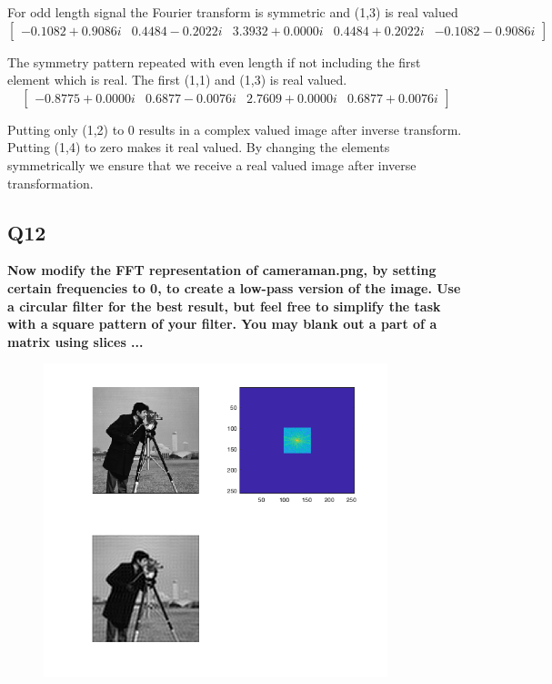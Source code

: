 \documentclass[oneside,a4paper]{article}
\begin{document}
For odd length signal the Fourier transform is symmetric and (1,3) is real valued
\begin{equation}
\begin{bmatrix} -0.1082 + 0.9086i&   0.4484 - 0.2022i&   3.3932 + 0.0000i&   0.4484 + 0.2022i&  -0.1082 - 0.9086i \end{bmatrix}
\nonumber
\end{equation}

The symmetry pattern repeated with even length if not including the first element which is real. The first (1,1) and (1,3) is real valued.
\begin{equation}
\begin{bmatrix} -0.8775 + 0.0000i&   0.6877 - 0.0076i&   2.7609 + 0.0000i&   0.6877 + 0.0076i \end{bmatrix}
\nonumber
\end{equation}

Putting only (1,2) to 0 results in a complex valued image after inverse transform. Putting (1,4) to zero makes it real valued. By changing the elements symmetrically we ensure that we receive a real valued image after inverse transformation. 


\subsection*{Q12}
\noindent \textbf{Now modify the FFT representation of cameraman.png, by setting certain frequencies to 0, to create a low-pass version of the image. Use a circular filter for the best result, but feel free to simplify the task with a square pattern of your filter. You may blank out a part of a matrix using slices ...}

\begin{figure}[ht!]
\centering
\includegraphics[width=100mm]{figures/Q12.png}
\caption{}
\label{fig:Q12}
\end{figure}
\end{document}
